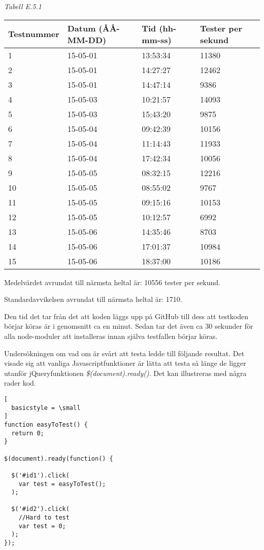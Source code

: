 \noindent\emph{Tabell E.5.1}
\begin{center}
  \begin{tabular}{| l | l | l | l |}
  \hline
  Testnummer & Datum (ÅÅ-MM-DD) & Tid (hh-mm-ss) & Tester per sekund\\ \hline
  1 & 15-05-01 & 13:53:34 & 11380\\ \hline
  2 & 15-05-01 & 14:27:27 & 12462\\ \hline
  3 & 15-05-01 & 14:47:14 & 9386\\ \hline 
  4 & 15-05-03 & 10:21:57 & 14093\\ \hline 
  5 & 15-05-03 & 15:43:20 & 9875\\ \hline 
  6 & 15-05-04 & 09:42:39 & 10156\\ \hline 
  7 & 15-05-04 & 11:14:43 & 11933\\ \hline 
  8 & 15-05-04 & 17:42:34 & 10056\\ \hline 
  9 & 15-05-05 & 08:32:15 & 12216\\ \hline 
  10 & 15-05-05 & 08:55:02 & 9767\\ \hline 
  11 & 15-05-05 & 09:15:16 & 10153\\ \hline 
  12 & 15-05-05 & 10:12:57 & 6992\\ \hline 
  13 & 15-05-06 & 14:35:46 & 8703\\ \hline 
  14 & 15-05-06 & 17:01:37 & 10984\\ \hline 
  15 & 15-05-06 & 18:37:00 & 10186\\ \hline 
  \end{tabular}
\end{center}

Medelvärdet avrundat till närmsta heltal är: 10556 tester per sekund.

Standardavvikelsen avrundat till närmsta heltal är: 1710.

Den tid det tar från det att koden läggs upp på GitHub till dess att 
testkoden börjar köras är i genomsnitt ca en minut. Sedan tar det även ca 30
sekunder för alla node-moduler att installeras innan själva
testfallen börjar köras.

Undersökningen om vad om är svårt att testa ledde till följande resultat.
Det visade sig att vanliga Javascriptfunktioner är lätta
att testa så länge de ligger utanför jQueryfunktionen
\emph{\$(document).ready()}. Det kan illustreras med några
rader kod.

\begin{lstlisting}[
  basicstyle = \small
]
function easyToTest() {
  return 0;
}

$(document).ready(function() {

  $('#id1').click(
    var test = easyToTest(); 
  );

  $('#id2').click(
    //Hard to test
    var test = 0; 
  );
});

\end{lstlisting}

